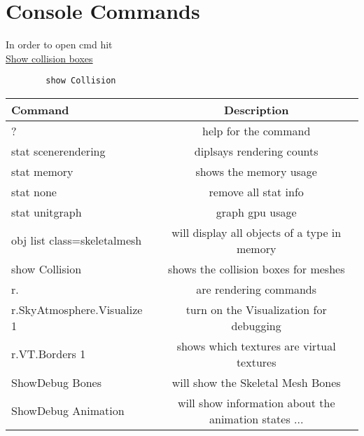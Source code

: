 \documentclass{scrbook}
\begin{document}
    \chapter{Console Commands}
        In order to open cmd hit \^ \\
        \underline{Show collision boxes}
        \begin{lstlisting}
        show Collision
        \end{lstlisting}
        \begin{table}[H]
            \begin{tabular}{|l|c|}
                \hline
                    Command & Description \\
                \hline
                    [COMMAND] ? & help for the command \\
                    stat scenerendering & diplsays rendering counts \\
                    stat memory & shows the memory usage \\
                    stat none & remove all stat info \\
                    stat unitgraph & graph gpu usage \\
                    obj list class=skeletalmesh & will display all objects of a type in memory \\
                    show Collision & shows the collision boxes for meshes \\
                    r. & are rendering commands \\
                    r.SkyAtmosphere.Visualize 1 & turn on the Visualization for debugging \\
                    r.VT.Borders 1 & shows which textures are virtual textures \\
                    ShowDebug Bones & will show the Skeletal Mesh Bones \\
                    ShowDebug Animation & will show information about the animation states ... \\
                    
                \hline
            \end{tabular}
        \end{table}
\smallskip
\end{document}
